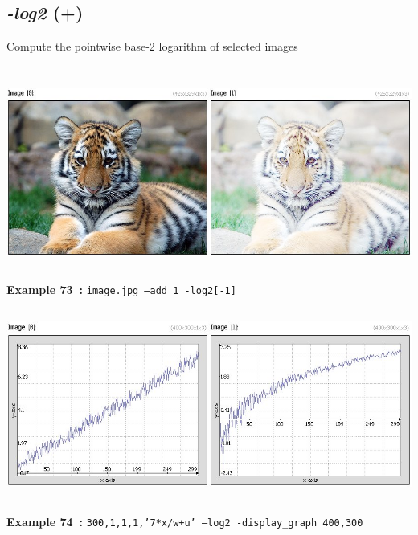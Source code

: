 \documentclass[a4paper,11pt,twoside]{book}
\begin{document}
\subsection{\emph{-log2} (+)}\vspace*{-0.5em}
Compute the pointwise base-2 logarithm of selected images
\begin{center}\includegraphics[keepaspectratio=true,height=7cm,width=\textwidth]{img/gmic_def73.jpg}\\
{\footnotesize \textbf{Example 73~:} \texttt{image.jpg --add 1 -log2[-1]}}
\\\includegraphics[keepaspectratio=true,height=7cm,width=\textwidth]{img/gmic_def74.jpg}\\
{\footnotesize \textbf{Example 74~:} \texttt{300,1,1,1,'7*x/w+u' --log2 -display\_graph 400,300}}
\end{center}
\end{document}
